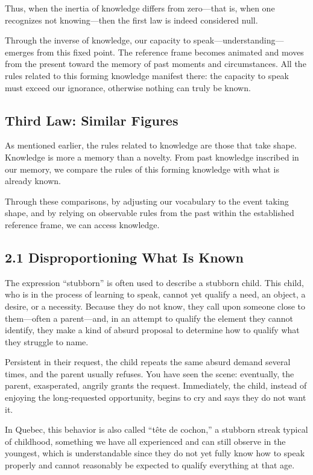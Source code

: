 \documentclass[12pt,oneside]{article}
\begin{document}
Thus, when the inertia of knowledge differs from zero—that is, when one recognizes not knowing—then the first law is indeed considered null.

Through the inverse of knowledge, our capacity to speak—understanding—emerges from this fixed point. The reference frame becomes animated and moves from the present toward the memory of past moments and circumstances. All the rules related to this forming knowledge manifest there: the capacity to speak must exceed our ignorance, otherwise nothing can truly be known.

\subsection{Third Law: Similar Figures}

As mentioned earlier, the rules related to knowledge are those that take shape. Knowledge is more a memory than a novelty. From past knowledge inscribed in our memory, we compare the rules of this forming knowledge with what is already known.

Through these comparisons, by adjusting our vocabulary to the event taking shape, and by relying on observable rules from the past within the established reference frame, we can access knowledge.

\subsection{2.1 Disproportioning What Is Known}

The expression “stubborn” is often used to describe a stubborn child. This child, who is in the process of learning to speak, cannot yet qualify a need, an object, a desire, or a necessity. Because they do not know, they call upon someone close to them—often a parent—and, in an attempt to qualify the element they cannot identify, they make a kind of absurd proposal to determine how to qualify what they struggle to name.

Persistent in their request, the child repeats the same absurd demand several times, and the parent usually refuses. You have seen the scene: eventually, the parent, exasperated, angrily grants the request. Immediately, the child, instead of enjoying the long‑requested opportunity, begins to cry and says they do not want it.

In Quebec, this behavior is also called “tête de cochon,” a stubborn streak typical of childhood, something we have all experienced and can still observe in the youngest, which is understandable since they do not yet fully know how to speak properly and cannot reasonably be expected to qualify everything at that age.
\end{document}
